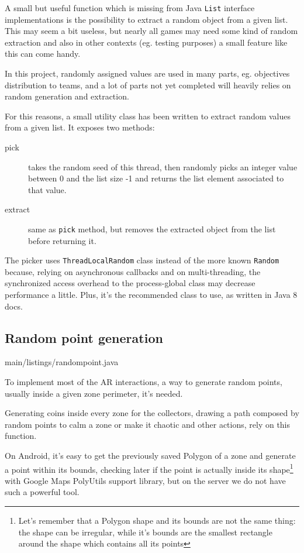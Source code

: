 			A small but useful function which is missing from Java \lstinline|List| interface implementations is the possibility to extract a random object from a given list.
			This may seem a bit useless, but nearly all games may need some kind of random extraction and also in other contexts (eg. testing purposes) a small feature like this can come handy.
			
			In this project, randomly assigned values are used in many parts, eg. objectives distribution to teams, and a lot of parts not yet completed will heavily relies on random generation and extraction.
			
			For this reasons, a small utility class has been written to extract random values from a given list. It exposes two methods:
			\begin{description}
				\item[pick] takes the random seed of this thread, then randomly picks an integer value between 0 and the list size -1 and returns the list element associated to that value. 
				\item[extract] same as \lstinline|pick| method, but removes the extracted object from the list before returning it.
			\end{description}
		
			The picker uses \lstinline|ThreadLocalRandom| class instead of the more known \lstinline|Random| because, relying on asynchronous callbacks and on multi-threading, the synchronized access overhead to the process-global class may decrease performance a little.
			Plus, it's the recommended class to use, as written in Java 8 docs.
						
		\subsection{Random point generation}\label{focus:point}
		
			
							{main/listings/randompoint.java}
			
			To implement most of the AR interactions, a way to generate random points, usually inside a given zone perimeter, it's needed.
			
			Generating coins inside every zone for the collectors, drawing a path composed by random points to calm a zone or make it chaotic and other actions, rely on this function.
			
			On Android, it's easy to get the previously saved Polygon of a zone and generate a point within its bounds, checking later if the point is actually inside its shape\footnote{Let's remember that a Polygon shape and its bounds are not the same thing: the shape can be irregular, while it's bounds are the smallest rectangle around the shape which contains all its points} with Google Maps PolyUtils support library, but on the server we do not have such a powerful tool.
			
